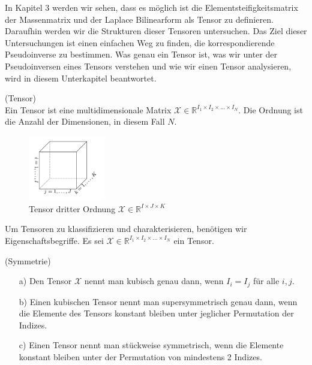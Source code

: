 In Kapitel 3 werden wir sehen, dass es möglich ist die Elementsteifigkeitsmatrix der Massenmatrix und der Laplace Bilinearform als Tensor zu definieren. Daraufhin werden wir die Strukturen dieser Tensoren untersuchen. Das Ziel dieser Untersuchungen ist einen einfachen Weg zu finden, die korrespondierende Pseudoinverse zu bestimmen. Was genau ein Tensor ist, was wir unter der Pseudoinversen eines Tensors verstehen und wie wir einen Tensor analysieren, wird in diesem Unterkapitel beantwortet.


\begin{Definition} (Tensor) \\
Ein Tensor ist eine multidimensionale Matrix $\pmb{\mathscr{X}}  \in \mathbb{R}^{I_1 \times I_2 \times \dots \times I_N}$.
Die Ordnung ist die Anzahl der Dimensionen, in diesem Fall $N$. 
\end{Definition}

\begin{figure}[ht]
	\centering
  \includegraphics[width=0.3\textwidth]{tensorOrdnung3.png}
	\caption{Tensor dritter Ordnung $\pmb{\mathscr{X}}  \in \mathbb{R}^{I \times J \times K}$ \cite[456]{Kolda}}
	\label{fig:tensorOrdnung3}
\end{figure}

Um Tensoren zu klassifizieren und charakterisieren, benötigen wir Eigenschaftsbegriffe. Es sei $\pmb{\mathscr{X}}  \in \mathbb{R}^{I_1 \times I_2 \times \dots \times I_N}$ ein Tensor.
\begin{Definition} (Symmetrie)
\begin{itemize}
\item[a)] Den Tensor $\pmb{\mathscr{X}}$ nennt man kubisch genau dann, wenn $I_i = I_j$ für alle $i,j$.
\item[b)] Einen kubischen Tensor nennt man supersymmetrisch genau dann, wenn die Elemente des Tensors konstant bleiben unter jeglicher Permutation der Indizes.
\item[c)] Einen Tensor nennt man stückweise symmetrisch, wenn die Elemente konstant bleiben unter der Permutation von mindestens 2 Indizes.
\end{itemize}
\end{Definition}

